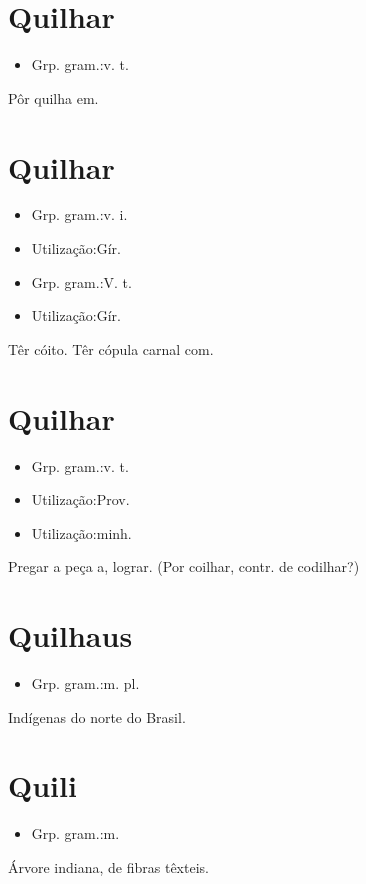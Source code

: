 \section{Quilhar}
\begin{itemize}
\item {Grp. gram.:v. t.}
\end{itemize}
Pôr quilha em.
\section{Quilhar}
\begin{itemize}
\item {Grp. gram.:v. i.}
\end{itemize}
\begin{itemize}
\item {Utilização:Gír.}
\end{itemize}
\begin{itemize}
\item {Grp. gram.:V. t.}
\end{itemize}
\begin{itemize}
\item {Utilização:Gír.}
\end{itemize}
Têr cóito.
Têr cópula carnal com.
\section{Quilhar}
\begin{itemize}
\item {Grp. gram.:v. t.}
\end{itemize}
\begin{itemize}
\item {Utilização:Prov.}
\end{itemize}
\begin{itemize}
\item {Utilização:minh.}
\end{itemize}
Pregar a peça a, lograr.
(Por \textunderscore coilhar\textunderscore , contr. de \textunderscore codilhar\textunderscore ?)
\section{Quilhaus}
\begin{itemize}
\item {Grp. gram.:m. pl.}
\end{itemize}
Indígenas do norte do Brasil.
\section{Quili}
\begin{itemize}
\item {Grp. gram.:m.}
\end{itemize}
Árvore indiana, de fibras têxteis.
